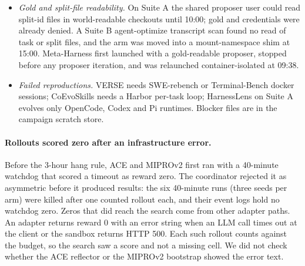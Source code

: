 \begin{itemize}[leftmargin=*,nosep]
\item \emph{Gold and split-file readability.} On Suite A the shared proposer user could read split-id files in world-readable checkouts until 10:00; gold and credentials were already denied. A Suite B agent-optimize transcript scan found no read of task or split files, and the arm was moved into a mount-namespace shim at 15:00. Meta-Harness first launched with a gold-readable proposer, stopped before any proposer iteration, and was relaunched container-isolated at 09:38.
\item \emph{Failed reproductions.} VERSE needs SWE-rebench or Terminal-Bench docker sessions; CoEvoSkills needs a Harbor per-task loop; HarnessLens on Suite A evolves only OpenCode, Codex and Pi runtimes. Blocker files are in the campaign scratch store.
\end{itemize}

\paragraph{Rollouts scored zero after an infrastructure error.}
Before the 3-hour hang rule, ACE and MIPROv2 first ran with a 40-minute watchdog that scored a timeout as reward zero.
The coordinator rejected it as asymmetric before it produced results: the six 40-minute runs (three seeds per arm) were killed after one counted rollout each, and their event logs hold no watchdog zero.
Zeros that did reach the search come from other adapter paths.
An adapter returns reward 0 with an error string when an LLM call times out at the client or the sandbox returns HTTP 500.
Each such rollout counts against the budget, so the search saw a score and not a missing cell.
We did not check whether the ACE reflector or the MIPROv2 bootstrap showed the error text.

